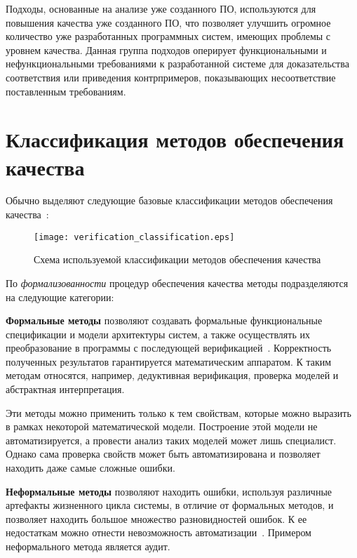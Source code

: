 Подходы, основанные на анализе уже созданного ПО, используются для повышения
качества уже созданного ПО, что позволяет улучшить огромное количество уже
разработанных программных систем, имеющих проблемы с уровнем качества. Данная
группа подходов оперирует функциональными и нефункциональными требованиями к
разработанной системе для доказательства соответствия или приведения
контрпримеров, показывающих несоответствие поставленным требованиям.

\section{Классификация методов обеспечения качества}

Обычно выделяют следующие базовые классификации методов обеспечения
качества~\cite{itsykson}:

\begin{figure}[ht]
    \begin{center}
        \texttt{[image: verification\_classification.eps]}
    \end{center}
    \caption{Схема используемой классификации методов обеспечения качества}
    \label{fig:verification_classification}
\end{figure}

По \emph{формализованности} процедур обеспечения качества методы
подразделяются на следующие категории:

\textbf{Формальные методы} позволяют создавать формальные функциональные
спецификации и модели архитектуры систем, а также осуществлять их преобразование
в программы с последующей верификацией~\cite{formal_methods}. Корректность
полученных результатов гарантируется математическим аппаратом. К таким методам
относятся, например, дедуктивная верификация, проверка моделей и абстрактная
интерпретация.

Эти методы можно применить только к тем свойствам, которые можно выразить в
рамках некоторой математической модели. Построение этой модели не
автоматизируется, а провести анализ таких моделей может лишь специалист. Однако
сама проверка свойств может быть автоматизирована и позволяет находить даже
самые сложные ошибки.

\textbf{Неформальные методы} позволяют находить ошибки, используя различные
артефакты жизненного цикла системы, в отличие от формальных методов, и позволяет
находить большое множество разновидностей ошибок. К ее недостаткам можно отнести
невозможность автоматизации~\cite{kulyamin}. Примером неформального метода
является аудит.

